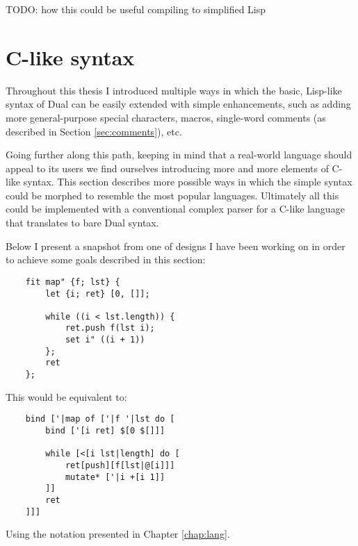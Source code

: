 TODO: how this could be useful
compiling to simplified Lisp
 
\section{C-like syntax}
Throughout this thesis I introduced multiple ways in which the basic, Lisp-like syntax of Dual can be easily extended with simple enhancements, such as adding more general-purpose special characters, macros, single-word comments (as described in Section \ref{sec:comments}), etc.

Going further along this path, keeping in mind that a real-world language should appeal to its users we find ourselves introducing more and more elements of C-like syntax. This section describes more possible ways in which the simple syntax could be morphed to resemble the most popular languages.
Ultimately all this could be implemented with a conventional complex parser for a C-like language that translates to bare Dual syntax.

Below I present a snapshot from one of designs I have been working on in order to achieve some goals described in this section:
\begin{lstlisting}
    fit map" {f; lst} {
    	let {i; ret} [0, []];
    	
    	while ((i < lst.length)) {
    		ret.push f(lst i);
    		set i" ((i + 1))
    	};
    	ret
    };
\end{lstlisting}

This would be equivalent to:
\begin{lstlisting}
    bind ['|map of ['|f '|lst do [
    	bind ['[i ret] $[0 $[]]]
    	
    	while [<[i lst|length] do [
    		ret[push][f[lst|@[i]]] 
    		mutate* ['|i +[i 1]]
    	]]
    	ret
    ]]]
\end{lstlisting}

Using the notation presented in Chapter \ref{chap:lang}.

